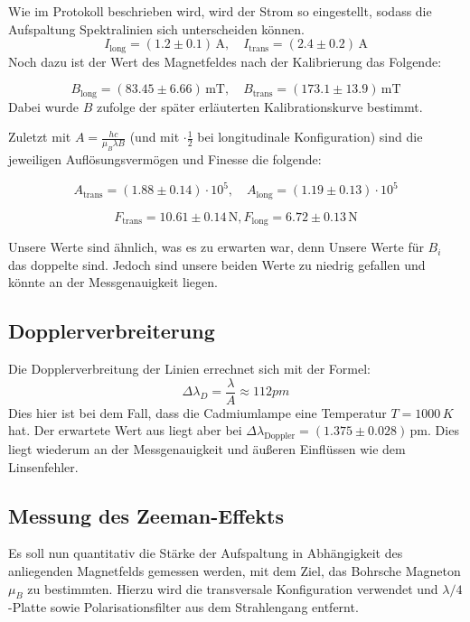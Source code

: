 \documentclass{article}
\begin{document}
\begin{multicols}{2}
Wie im Protokoll beschrieben wird, wird der Strom so eingestellt, sodass die Aufspaltung
Spektralinien sich unterscheiden können.
\[
I_{\text{long}} = (1.2 \pm 0.1) \, \text{A}, \quad I_{\text{trans}} = (2.4 \pm 0.2) \, \text{A}
\]
Noch dazu ist der Wert des Magnetfeldes nach der Kalibrierung das Folgende: 

\[
B_{\text{long}} = ( 83.45 \pm 6.66) \, \text{mT}, \quad B_{\text{trans}} = (173.1 \pm 13.9) \, \text{mT}
\]
Dabei wurde $B$ zufolge der später erläuterten Kalibrationskurve bestimmt.

Zuletzt mit $A=\frac{hc}{\mu_B \lambda B}$ (und mit $\cdot \frac{1}{2}$ bei longitudinale 
Konfiguration) sind die jeweiligen Auflösungsvermögen und Finesse die folgende:

\[
A_{\text{trans}} = (1.88 \pm 0.14) \cdot 10^5, \quad A_{\text{long}} = (1.19 \pm 0.13) \cdot 10^5
\]

\[
  F_{\text{trans}} = 10.61 \pm 0.14 \, \text{N}, F_{\text{long}} = 6.72 \pm 0.13 \, \text{N}
\]

Unsere Werte sind ähnlich, was es zu erwarten war, denn Unsere Werte für 
$B_i$ das doppelte sind. Jedoch sind unsere beiden Werte zu niedrig gefallen und 
könnte an der Messgenauigkeit liegen. 

\subsection{Dopplerverbreiterung}
Die Dopplerverbreitung der Linien errechnet sich mit der Formel:
\begin{equation*}
  \Delta \lambda_D = \frac{\lambda}{A} \approx 112 pm
\end{equation*}
Dies hier ist bei dem Fall, dass die Cadmiumlampe eine Temperatur 
\( T=1000\,K \) hat. Der erwartete Wert aus \cite{einheit}liegt aber bei \( \Delta \lambda_{\text{Doppler}}
 = (1.375 \pm 0.028) \, \text{pm} \). Dies liegt wiederum an der Messgenauigkeit und 
 äußeren Einflüssen wie dem Linsenfehler.


\subsection{Messung des Zeeman-Effekts}
Es soll nun quantitativ die Stärke der Aufspaltung in Abhängigkeit des anliegenden Magnetfelds gemessen werden,
mit dem Ziel, das Bohrsche Magneton $\mu_B$ zu bestimmten.
Hierzu wird die transversale Konfiguration verwendet und $\lambda/4$-Platte sowie Polarisationsfilter aus dem Strahlengang entfernt.


\end{multicols}
\end{document}
